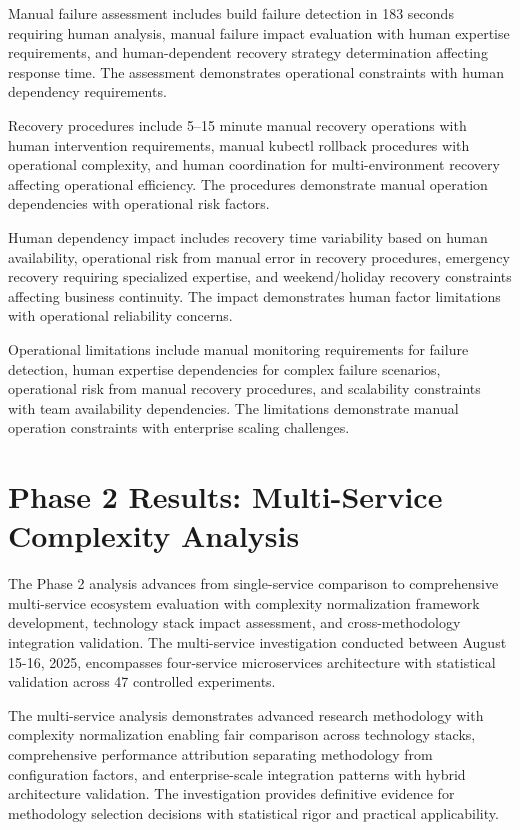 Manual failure assessment includes build failure detection in 183 seconds requiring human analysis, manual failure impact evaluation with human expertise requirements, and human-dependent recovery strategy determination affecting response time. The assessment demonstrates operational constraints with human dependency requirements.

Recovery procedures include 5--15 minute manual recovery operations with human intervention requirements, manual kubectl rollback procedures with operational complexity, and human coordination for multi-environment recovery affecting operational efficiency. The procedures demonstrate manual operation dependencies with operational risk factors.

Human dependency impact includes recovery time variability based on human availability, operational risk from manual error in recovery procedures, emergency recovery requiring specialized expertise, and weekend/holiday recovery constraints affecting business continuity. The impact demonstrates human factor limitations with operational reliability concerns.

Operational limitations include manual monitoring requirements for failure detection, human expertise dependencies for complex failure scenarios, operational risk from manual recovery procedures, and scalability constraints with team availability dependencies. The limitations demonstrate manual operation constraints with enterprise scaling challenges.


\section{Phase 2 Results: Multi-Service Complexity Analysis}
\label{sec:phase2_results}

The Phase 2 analysis advances from single-service comparison to comprehensive multi-service ecosystem evaluation with complexity normalization framework development, technology stack impact assessment, and cross-methodology integration validation. The multi-service investigation conducted between August 15-16, 2025, encompasses four-service microservices architecture with statistical validation across 47 controlled experiments.

The multi-service analysis demonstrates advanced research methodology with complexity normalization enabling fair comparison across technology stacks, comprehensive performance attribution separating methodology from configuration factors, and enterprise-scale integration patterns with hybrid architecture validation. The investigation provides definitive evidence for methodology selection decisions with statistical rigor and practical applicability.

